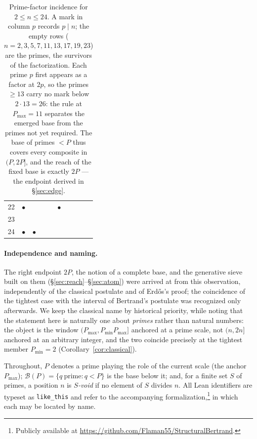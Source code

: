 \documentclass[11pt,a4paper]{amsart}
\theoremstyle{plain}
\theoremstyle{definition}
\theoremstyle{plain}
\theoremstyle{remark}
\newcommand{\lean}[1]{\textup{\texttt{#1}}}
\begin{document}
\begin{table}[htbp]
\begin{tabular}{r|ccccc|cccc}
22 & $\bullet$  &            &            &            & $\bullet$  & & & &\\
23 &            &            &            &            &            & & & &\\
24 & $\bullet$  & $\bullet$  &            &            &            & & & &\\
\end{tabular}
\caption{Prime-factor incidence for $2\le n\le 24$. A mark in column $p$ records $p\mid n$;
the empty rows ($n=2,3,5,7,11,13,17,19,23$) are the primes, the survivors of the
factorization. Each prime $p$ first appears as a factor at $2p$, so the primes $\ge 13$ carry
no mark below $2\cdot13=26$: the rule at $P_{\max}=11$ separates the emerged base from the
primes not yet required. The base of primes $<P$ thus covers every composite in $(P,2P]$, and
the reach of the fixed base is exactly $2P$ --- the endpoint derived in \S\ref{sec:edge}.}
\label{tab:incidence}
\end{table}

\paragraph{Independence and naming.}
The right endpoint $2P$, the notion of a complete base, and the generative sieve built on
them (\S\ref{sec:reach}--\S\ref{sec:atom}) were arrived at from this observation,
independently of the classical postulate and of Erd\H{o}s's proof; the coincidence of the
tightest case with the interval of Bertrand's postulate was recognized only afterwards. We
keep the classical name by historical priority, while noting that the statement here is
naturally one about \emph{primes} rather than natural numbers: the object is the window
$(P_{\max},P_{\min}P_{\max}]$ anchored at a prime scale, not $(n,2n]$ anchored at an
arbitrary integer, and the two coincide precisely at the tightest member $P_{\min}=2$
(Corollary~\ref{cor:classical}).

Throughout, $P$ denotes a prime playing the role of the current scale (the anchor
$P_{\max}$); $\mathcal{B}(P)=\{q\ \text{prime}: q<P\}$ is the base below it; and, for a
finite set $S$ of primes, a position $n$ is \emph{$S$-void} if no element of $S$ divides
$n$. All Lean identifiers are typeset as \lean{like\_this} and refer to the accompanying
formalization,\footnote{Publicly available at
\url{https://github.com/Flaman55/StructuralBertrand}.}
in which each may be located by name.

\end{document}
